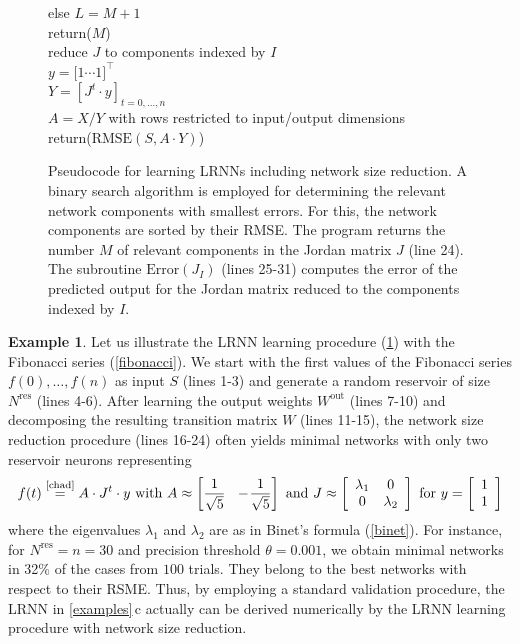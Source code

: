 \documentclass[twoside,11pt]{article}
\theoremstyle{definition}
\newtheorem{exmp}{Example}
\begin{document}
\begin{figure}
\begin{algorithmic}[1]
	\qquad else $L = M+1$\\
	return\big($M$\big)\newline
	\\
	\quad reduce $J$ to components indexed by $I$\\
	\quad $y = \big[ 1 \cdots 1 \big]^\top$\\
	\quad $Y = \left[J^t \cdot y\right]_{t=0,\dots,n}$\\
	\quad $A = X/Y$ with rows restricted to input/output dimensions\\
	return\big($\mathrm{RMSE}(S,A \cdot Y)$\big)
\end{algorithmic}
\caption{Pseudocode for learning LRNNs including network size reduction. A
binary search algorithm is employed for determining the relevant network
components with smallest errors. For this, the network components are sorted by
their RMSE. The program returns the number $M$ of relevant components in the
Jordan matrix $J$ (line 24). The subroutine $\mathrm{Error}(J_I)$ (lines 25-31)
computes the error of the predicted output for the Jordan matrix reduced to the
components indexed by $I$.}
\label{proc}
\end{figure}

\begin{exmp}\label{continued}
Let us illustrate the LRNN learning procedure (\cref{proc}) with the Fibonacci
series (\cref{fibonacci}). We start with the first values of the Fibonacci
series $f(0),\dots,f(n)$ as input $S$ (lines 1-3) and generate a random
reservoir of size $N^\mathrm{res}$ (lines 4-6). After learning the output
weights $W^\mathrm{out}$ (lines 7-10) and decomposing the resulting transition
matrix $W$ (lines 11-15), the network size reduction procedure (lines 16-24)
often yields minimal networks with only two reservoir neurons representing
\[
    f(t) \overset{\text{\cref{chad}}}{=} A \cdot J^t \cdot y \text{~with~}
	A \approx \left[ \frac{1}{\sqrt{5}} ~~ -\!\frac{1}{\sqrt{5}} \right] \text{~and~}
	J \approx \left[ \begin{array}{cc}
		\lambda_1 & 0\\
		0 & \lambda_2
   	\end{array} \right] \text{~for~}
	y = \left[ \begin{array}{c}
	1\\
	1
   \end{array} \right]
\]
where the eigenvalues $\lambda_1$ and $\lambda_2$ are as in Binet's formula
(\cref{binet}). For instance, for $N^\mathrm{res}=n=30$ and precision threshold
$\theta=0.001$, we obtain minimal networks in 32\% of the cases from $100$
trials. They belong to the best networks with respect to their RSME. Thus,
by employing a standard validation procedure, the LRNN in \cref{examples}\,c
actually can be derived numerically by the LRNN learning procedure with network
size reduction.
\end{exmp}
\end{document}
